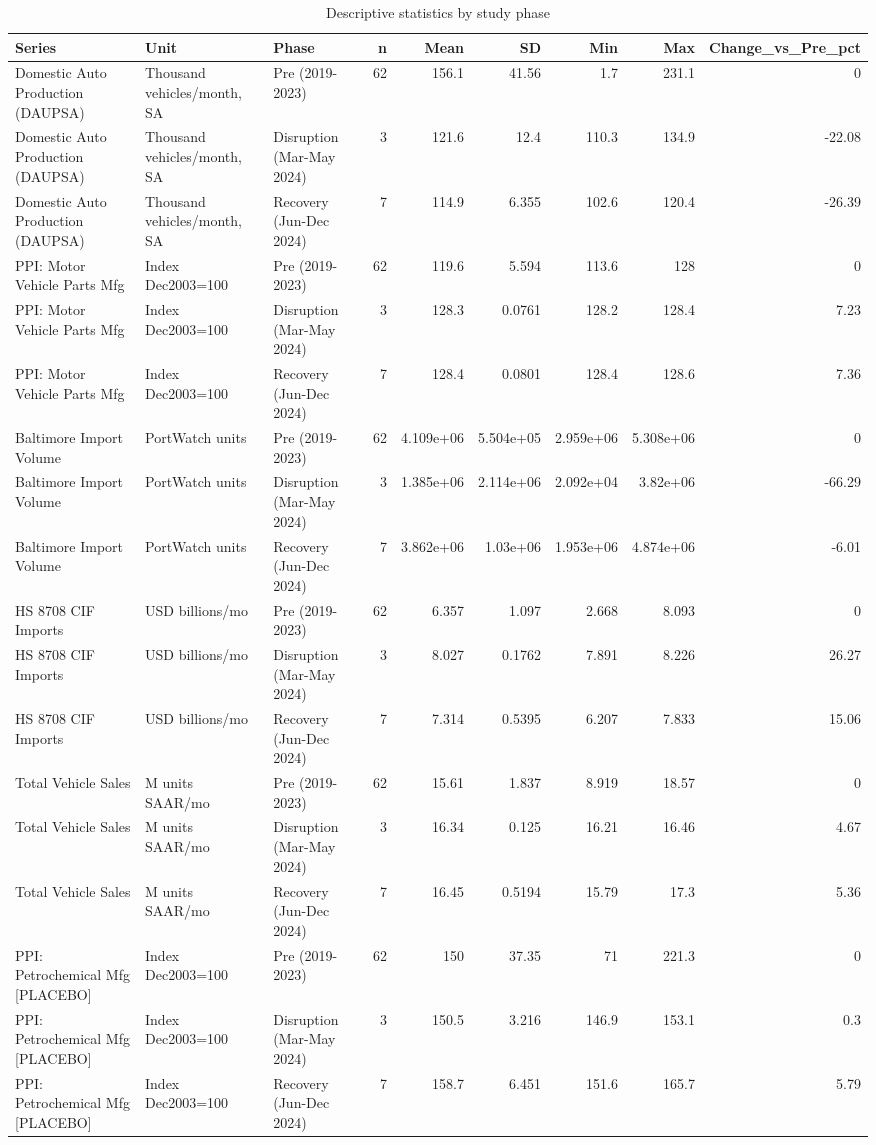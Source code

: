 \begin{table}
\caption{Descriptive statistics by study phase}
\label{tab:table1_descriptive_statistics}
\begin{tabular}{lllrrrrrr}
\toprule
Series & Unit & Phase & n & Mean & SD & Min & Max & Change\_vs\_Pre\_pct \\
\midrule
Domestic Auto Production (DAUPSA) & Thousand vehicles/month, SA & Pre (2019-2023) & 62 & 156.1 & 41.56 & 1.7 & 231.1 & 0 \\
Domestic Auto Production (DAUPSA) & Thousand vehicles/month, SA & Disruption (Mar-May 2024) & 3 & 121.6 & 12.4 & 110.3 & 134.9 & -22.08 \\
Domestic Auto Production (DAUPSA) & Thousand vehicles/month, SA & Recovery (Jun-Dec 2024) & 7 & 114.9 & 6.355 & 102.6 & 120.4 & -26.39 \\
PPI: Motor Vehicle Parts Mfg & Index Dec2003=100 & Pre (2019-2023) & 62 & 119.6 & 5.594 & 113.6 & 128 & 0 \\
PPI: Motor Vehicle Parts Mfg & Index Dec2003=100 & Disruption (Mar-May 2024) & 3 & 128.3 & 0.0761 & 128.2 & 128.4 & 7.23 \\
PPI: Motor Vehicle Parts Mfg & Index Dec2003=100 & Recovery (Jun-Dec 2024) & 7 & 128.4 & 0.0801 & 128.4 & 128.6 & 7.36 \\
Baltimore Import Volume & PortWatch units & Pre (2019-2023) & 62 & 4.109e+06 & 5.504e+05 & 2.959e+06 & 5.308e+06 & 0 \\
Baltimore Import Volume & PortWatch units & Disruption (Mar-May 2024) & 3 & 1.385e+06 & 2.114e+06 & 2.092e+04 & 3.82e+06 & -66.29 \\
Baltimore Import Volume & PortWatch units & Recovery (Jun-Dec 2024) & 7 & 3.862e+06 & 1.03e+06 & 1.953e+06 & 4.874e+06 & -6.01 \\
HS 8708 CIF Imports & USD billions/mo & Pre (2019-2023) & 62 & 6.357 & 1.097 & 2.668 & 8.093 & 0 \\
HS 8708 CIF Imports & USD billions/mo & Disruption (Mar-May 2024) & 3 & 8.027 & 0.1762 & 7.891 & 8.226 & 26.27 \\
HS 8708 CIF Imports & USD billions/mo & Recovery (Jun-Dec 2024) & 7 & 7.314 & 0.5395 & 6.207 & 7.833 & 15.06 \\
Total Vehicle Sales & M units SAAR/mo & Pre (2019-2023) & 62 & 15.61 & 1.837 & 8.919 & 18.57 & 0 \\
Total Vehicle Sales & M units SAAR/mo & Disruption (Mar-May 2024) & 3 & 16.34 & 0.125 & 16.21 & 16.46 & 4.67 \\
Total Vehicle Sales & M units SAAR/mo & Recovery (Jun-Dec 2024) & 7 & 16.45 & 0.5194 & 15.79 & 17.3 & 5.36 \\
PPI: Petrochemical Mfg [PLACEBO] & Index Dec2003=100 & Pre (2019-2023) & 62 & 150 & 37.35 & 71 & 221.3 & 0 \\
PPI: Petrochemical Mfg [PLACEBO] & Index Dec2003=100 & Disruption (Mar-May 2024) & 3 & 150.5 & 3.216 & 146.9 & 153.1 & 0.3 \\
PPI: Petrochemical Mfg [PLACEBO] & Index Dec2003=100 & Recovery (Jun-Dec 2024) & 7 & 158.7 & 6.451 & 151.6 & 165.7 & 5.79 \\
\bottomrule
\end{tabular}
\end{table}
